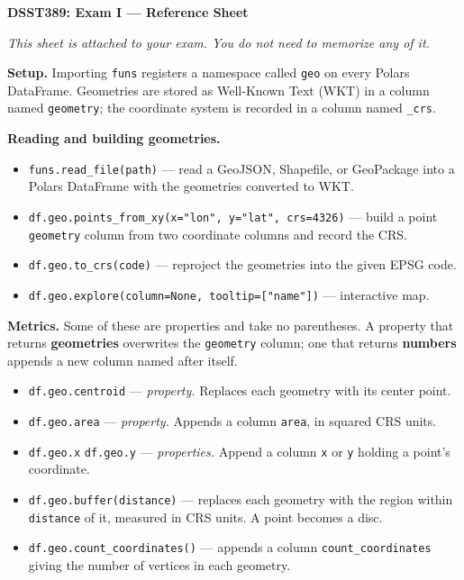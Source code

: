 \documentclass[11pt, a4paper]{article}
\newcommand{\code}[1]{\texttt{#1}}
\begin{document}
\small

\begin{center}
\normalsize\textbf{DSST389: Exam I --- Reference Sheet}
\end{center}

\smallskip

\textit{This sheet is attached to your exam. You do not need to memorize any of it.}

\smallskip

\textbf{Setup.}
Importing \code{funs} registers a namespace called \code{geo} on every Polars DataFrame.
Geometries are stored as Well-Known Text (WKT) in a column named \code{geometry}; the
coordinate system is recorded in a column named \code{\_crs}.

\smallskip

\textbf{Reading and building geometries.}

\begin{itemize}
  \item \code{funs.read\_file(path)} --- read a GeoJSON, Shapefile, or GeoPackage into a
        Polars DataFrame with the geometries converted to WKT.
  \item \code{df.geo.points\_from\_xy(x="lon", y="lat", crs=4326)} --- build a point
        \code{geometry} column from two coordinate columns and record the CRS.
  \item \code{df.geo.to\_crs(code)} --- reproject the geometries into the given EPSG code.
  \item \code{df.geo.explore(column=None, tooltip=["name"])} --- interactive map.
\end{itemize}

\smallskip

\textbf{Metrics.}
Some of these are properties and take no parentheses. A property that returns
\textbf{geometries} overwrites the \code{geometry} column; one that returns \textbf{numbers}
appends a new column named after itself.

\begin{itemize}
  \item \code{df.geo.centroid} --- \textit{property.} Replaces each geometry with its
        center point.
  \item \code{df.geo.area} --- \textit{property.} Appends a column \code{area}, in squared
        CRS units.
  \item \code{df.geo.x} \quad \code{df.geo.y} --- \textit{properties.} Append a column
        \code{x} or \code{y} holding a point's coordinate.
  \item \code{df.geo.buffer(distance)} --- replaces each geometry with the region within
        \code{distance} of it, measured in CRS units. A point becomes a disc.
  \item \code{df.geo.count\_coordinates()} --- appends a column \code{count\_coordinates}
        giving the number of vertices in each geometry.
\end{itemize}
\end{document}
